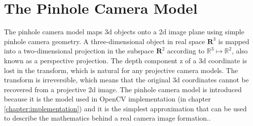 \documentclass[12pt,a4paper,oneside,pdftex]{report}
\begin{document}
\section{The Pinhole Camera Model}
\label{section:the_pinhole_camera_model}

The pinhole camera model maps 3d objects onto a 2d image plane using simple pinhole camera geometry. A three-dimensional object in real space $\mathbf{R}^3$ is mapped into a two-dimensional projection in the subspace $\mathbf{R}^2$ according to $\mathbb{R}^3 \mapsto \mathbb{R}^2$, also known as a perspective projection. The depth component z of a 3d coordinate is lost in the transform, which is natural for any projective camera models. The transform is irreversible, which means that the original 3d coordinates cannot be recovered from a projective 2d image. The pinhole camera model is introduced because it is the model used in OpenCV implementation (in chapter \ref{chapter:implementation}) and it is the simplest approximation that can be used to describe the mathematics behind a real camera image formation.\citep{Sonka07, OpenCVWeb}.

\end{document}
